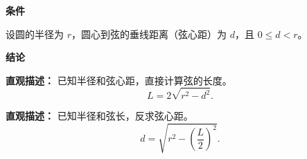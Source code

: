 \begin{statementbox}

	\textbf{\textcolor{CStatement}{条件}}
	\begin{description}[style=nextline, leftmargin=2.8em, labelsep=0.5em, itemsep=0.35em]
		\item[\textbf{\textcolor{CStatement}{条件 1（半径和弦心距）：}}] 设圆的半径为 $r$，圆心到弦的垂线距离（弦心距）为 $d$，且 $0 \le d < r$。
	\end{description}

	\textbf{\textcolor{CStatement}{结论}}
	\begin{description}[style=nextline, leftmargin=2.8em, labelsep=0.5em, itemsep=0.45em]
		\item[\textbf{\textcolor{CStatement}{结论一（弦长公式）：}}]
			\textbf{\textcolor{CStatement}{直观描述：}}
			已知半径和弦心距，直接计算弦的长度。
			\[
				L = 2\sqrt{r^{2} - d^{2}}.
			\]

		\item[\textbf{\textcolor{CStatement}{推广结论（弦心距公式）：}}]
			\textbf{\textcolor{CStatement}{直观描述：}}
			已知半径和弦长，反求弦心距。
			\[
				d = \sqrt{r^{2} - \left(\frac{L}{2}\right)^{2}}.
			\]
	\end{description}

\end{statementbox}
